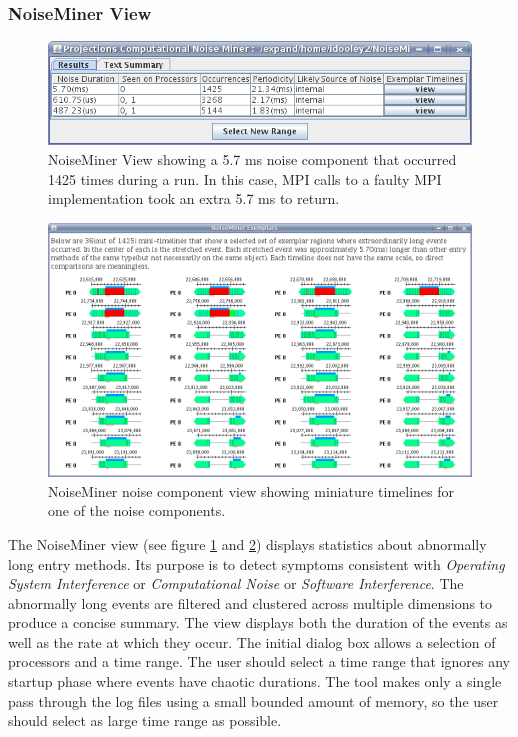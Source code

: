 
\subsubsection{NoiseMiner View}

\begin{figure}[!h]
\center
\includegraphics[width=6.0in]{fig/NoiseMiner1}
\caption{NoiseMiner View showing a 5.7 ms noise component that
occurred 1425 times during a run. In this case, MPI calls to a faulty
MPI implementation took an extra 5.7 ms to return. \label{noiseminer1}
}
\end{figure}

\begin{figure}[!h]
\center
\includegraphics[width=6.0in]{fig/NoiseMiner2}
\caption{NoiseMiner noise component view showing miniature timelines for 
one of the noise components.\label{noiseminer2} }
\end{figure}

The NoiseMiner view (see figure \ref{noiseminer1} and
\ref{noiseminer2}) displays statistics about abnormally long entry
methods. Its purpose is to detect symptoms consistent with
\textit{Operating System Interference} or \textit{Computational
Noise} or \textit{Software Interference}. The abnormally long events
are filtered and clustered across multiple dimensions to produce a
concise summary. The view displays both the duration of the events as
well as the rate at which they occur. The initial dialog box allows a
selection of processors and a time range. The user should select a
time range that ignores any startup phase where events have chaotic
durations. The tool makes only a single pass through the log files
using a small bounded amount of memory, so the user should select as
large time range as possible.
 
